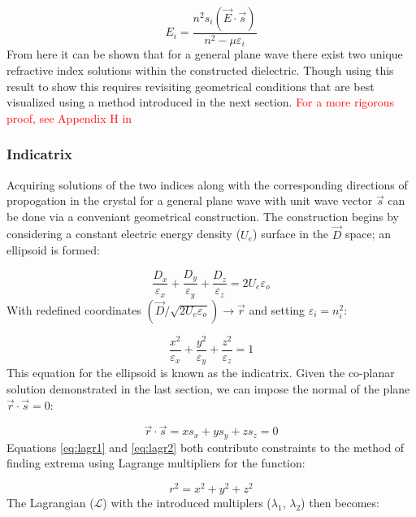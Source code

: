 \begin{equation}\label{eq:3.18}
E_i = \frac{n^2 s_i (\vec{E}\cdot\vec{s})}{n^2 - \mu \varepsilon_i}
\end{equation}
From here it can be shown that for a general plane wave there exist two unique refractive index solutions within the constructed dielectric. Though using this result to show this requires revisiting geometrical conditions that are best visualized using a method introduced in the next section. \textcolor{red}{For a more rigorous proof, see Appendix H in} \cite{nye}

\subsubsection{Indicatrix}
Acquiring solutions of the two indices along with the corresponding directions of propogation in the crystal for a general plane wave with unit wave vector $\vec{s}$ can be done via a conveniant geometrical construction. The construction begins by considering a constant electric energy density ($U_e$) surface in the $\vec{D}$ space; an ellipsoid is formed:

\begin{equation}\label{eq:lagr1}
\frac{D_x}{\varepsilon_x} + \frac{D_y}{\varepsilon_y} + \frac{D_z}{\varepsilon_z} = 2 U_e \varepsilon_o
\end{equation}
With redefined coordinates $(\vec{D}/\sqrt{2 U_e \varepsilon_o}) \rightarrow \vec{r}$ and setting $\varepsilon_i = n^2_i$:

\begin{equation}
\frac{x^2}{\varepsilon_x} + \frac{y^2}{\varepsilon_y} + \frac{z^2}{\varepsilon_z} = 1
\end{equation}
This equation for the ellipsoid is known as the indicatrix. Given the co-planar solution demonstrated in the last section, we can impose the normal of the plane $\vec{r} \cdot \vec{s} = 0$:

\begin{equation}\label{eq:lagr2}
\vec{r} \cdot \vec{s} = x s_x + y s_y + z s_z = 0
\end{equation}
Equations \ref{eq:lagr1} and \ref{eq:lagr2} both contribute constraints to the method of finding extrema using Lagrange multipliers for the function:

\begin{equation}
r^2 = x^2 + y^2 + z^2
\end{equation}
The Lagrangian ($\mathcal{L}$) with the introduced multiplers ($\lambda_1$, $\lambda_2$) then becomes:

